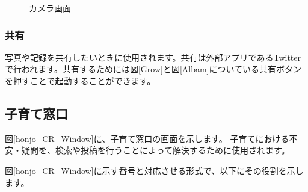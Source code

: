 \documentclass[a4j]{jarticle}
\begin{document}
\begin{figure}[H]
    \begin{center}
    \caption {カメラ画面}
    \label{Camera}
    \end{center}
\end{figure}


\subsubsection{共有}
写真や記録を共有したいときに使用されます。共有は外部アプリであるTwitterで行われます。共有するためには図\ref{Grow}と図\ref{Albam}についている共有ボタンを押すことで起動することができます。

\subsection{子育て窓口}
図\ref{honjo_CR_Window}に、子育て窓口の画面を示します。
子育てにおける不安・疑問を、検索や投稿を行うことによって解決するために使用されます。

図\ref{honjo_CR_Window}に示す番号と対応させる形式で、以下にその役割を示します。
\end{document}
